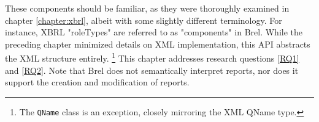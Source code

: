 These components should be familiar, as they were thoroughly examined in chapter \ref{chapter:xbrl},
albeit with some slightly different terminology. 
For instance, XBRL "roleTypes" are referred to as "components" in Brel.
While the preceding chapter minimized details on XML implementation, this API abstracts the XML structure entirely.
\footnote{The \texttt{QName} class is an exception, closely mirroring the XML QName type.}
This chapter addresses research questions \ref{RQ1} and \ref{RQ2}.
Note that Brel does not semantically interpret reports, 
nor does it support the creation and modification of reports.
